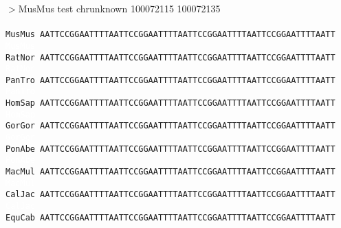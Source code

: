 \documentclass[11pt,twoside,reqno,a4paper]{article}
\begin{document}
\noindent
$>$MusMus	test	chrunknown	100072115	100072135 \\
 \\
\texttt{MusMus	AATTCCGGAATTTTAATTCCGGAATTTTAATTCCGGAATTTTAATTCCGGAATTTTAATT\\
\textcolor{white}{MusMus	}\ \ \ \ \ \ \ \ \ \ \ \ \ \ \ \ \ \ \ \ \ \ \ \ \ \ \ \ \ \ \ \ \ \ \ \ \ \ \ \ \ \ \ \ \ \ \ \ \ \ \ \ \ \ \ \ \ \ \ \ \\
RatNor	AATTCCGGAATTTTAATTCCGGAATTTTAATTCCGGAATTTTAATTCCGGAATTTTAATT\\
\textcolor{white}{RatNor	}\ \ \ \ \ \ \ \ \ \ \ \ \ \ \ \ \ \ \ \ \ \ \ \ \ \ \ \ \ \ \ \ \ \ \ \ \ \ \ \ \ \ \ \ \ \ \ \ \ \ \ \ \ \ \ \ \ \ \ \ \\
PanTro	AATTCCGGAATTTTAATTCCGGAATTTTAATTCCGGAATTTTAATTCCGGAATTTTAATT\\
\textcolor{white}{PanTro	}\ \ \ \ \ \ \ \ \ \ \ \ \ \ \ \ \ \ \ \ \ \ \ \ \ \ \ \ \ \ \ \ \ \ \ \ \ \ \ \ \ \ \ \ \ \ \ \ \ \ \ \ \ \ \ \ \ \ \ \ \\
HomSap	AATTCCGGAATTTTAATTCCGGAATTTTAATTCCGGAATTTTAATTCCGGAATTTTAATT\\
\textcolor{white}{HomSap	}\ \ \ \ \ \ \ \ \ \ \ \ \ \ \ \ \ \ \ \ \ \ \ \ \ \ \ \ \ \ \ \ \ \ \ \ \ \ \ \ \ \ \ \ \ \ \ \ \ \ \ \ \ \ \ \ \ \ \ \ \\
GorGor	AATTCCGGAATTTTAATTCCGGAATTTTAATTCCGGAATTTTAATTCCGGAATTTTAATT\\
\textcolor{white}{GorGor	}\ \ \ \ \ \ \ \ \ \ \ \ \ \ \ \ \ \ \ \ \ \ \ \ \ \ \ \ \ \ \ \ \ \ \ \ \ \ \ \ \ \ \ \ \ \ \ \ \ \ \ \ \ \ \ \ \ \ \ \ \\
PonAbe	AATTCCGGAATTTTAATTCCGGAATTTTAATTCCGGAATTTTAATTCCGGAATTTTAATT\\
\textcolor{white}{PonAbe	}\ \ \ \ \ \ \ \ \ \ \ \ \ \ \ \ \ \ \ \ \ \ \ \ \ \ \ \ \ \ \ \ \ \ \ \ \ \ \ \ \ \ \ \ \ \ \ \ \ \ \ \ \ \ \ \ \ \ \ \ \\
MacMul	AATTCCGGAATTTTAATTCCGGAATTTTAATTCCGGAATTTTAATTCCGGAATTTTAATT\\
\textcolor{white}{MacMul	}\ \ \ \ \ \ \ \ \ \ \ \ \ \ \ \ \ \ \ \ \ \ \ \ \ \ \ \ \ \ \ \ \ \ \ \ \ \ \ \ \ \ \ \ \ \ \ \ \ \ \ \ \ \ \ \ \ \ \ \ \\
CalJac	AATTCCGGAATTTTAATTCCGGAATTTTAATTCCGGAATTTTAATTCCGGAATTTTAATT\\
\textcolor{white}{CalJac	}\ \ \ \ \ \ \ \ \ \ \ \ \ \ \ \ \ \ \ \ \ \ \ \ \ \ \ \ \ \ \ \ \ \ \ \ \ \ \ \ \ \ \ \ \ \ \ \ \ \ \ \ \ \ \ \ \ \ \ \ \\
EquCab	AATTCCGGAATTTTAATTCCGGAATTTTAATTCCGGAATTTTAATTCCGGAATTTTAATT\\
}
\end{document}
